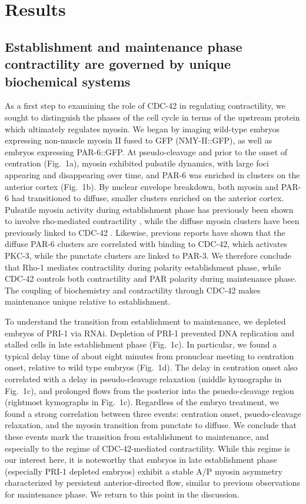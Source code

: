 \documentclass[11pt]{article}
\newcommand{\6}[1]{#1_{\text{6}}}
\newcommand{\3}[1]{#1_{\text{3}}}
\begin{document}
\section*{Results}

\subsection*{Establishment and maintenance phase contractility are governed by unique biochemical systems}

As a first step to examining the role of CDC-42 in regulating contractility, we sought to distinguish the phases of the cell cycle in terms of the upstream protein which ultimately regulates myosin. We began by imaging wild-type embryos expressing non-muscle myosin II fused to GFP (NMY-II::GFP), as well as embryos expressing PAR-6::GFP. At pseudo-cleavage and prior to the onset of centration (Fig.\ 1a), myosin exhibited pulsatile dynamics, with large foci appearing and disappearing over time, and PAR-6 was enriched in clusters on the anterior cortex (Fig.\ 1b). By nuclear envelope breakdown, both myosin and PAR-6 had transitioned to diffuse, smaller clusters enriched on the anterior cortex. Pulsatile myosin activity during establishment phase has previously been shown to involve rho-mediated contractility \citep{michaux2018excitable, michaud2022versatile, yao2022modulating}, while the diffuse myosin clusters have been previously linked to CDC-42 \citep{motegi2006sequential}. Likewise, previous reports \citep{motegi2006sequential, rodriguez2017apkc} have shown that the diffuse PAR-6 clusters are correlated with binding to CDC-42, which activates PKC-3, while the punctate clusters are linked to PAR-3. We therefore conclude that Rho-1 mediates contractility during polarity establishment phase, while CDC-42 controls both contractility and PAR polarity during maintenance phase. The coupling of biochemistry and contractility through CDC-42 makes maintenance unique relative to establishment.

To understand the transition from establishment to maintenance, we depleted embryos of PRI-1 via RNAi. Depletion of PRI-1 prevented DNA replication and stalled cells in late establishment phase (Fig.\ 1c). In particular, we found a typical delay time of about eight minutes from pronuclear meeting to centration onset, relative to wild type embryos (Fig.\ 1d). The delay in centration onset also correlated with a delay in pseudo-cleavage relaxation (middle kymographs in Fig.\ 1c), and prolonged flows from the posterior into the psuedo-cleavage region (rightmost kymographs in Fig.\ 1c). Regardless of the embryo treatment, we found a strong correlation between three events: centration onset, psuedo-cleavage relaxation, and the myosin transition from punctate to diffuse. We conclude that these events mark the transition from establishment to maintenance, and especially to the regime of CDC-42-mediated contractility. While this regime is our interest here, it is noteworthy that embryos in late establishment phase (especially PRI-1 depleted embryos) exhibit a stable A/P myosin asymmetry characterized by persistent anterior-directed flow, similar to previous observations for maintenance phase. We return to this point in the discussion.
\end{document}
